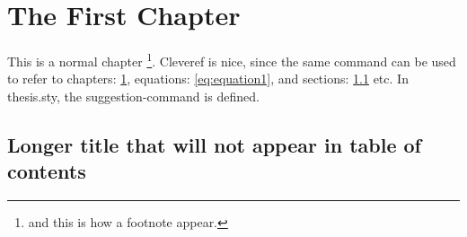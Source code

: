 \chapter{The First Chapter}\label{ch:chapter}

This is a normal chapter \footnote{and this is how a footnote appear.}. Cleveref is nice, since the same command can be used to refer to chapters: \cref{ch:chapter}, equations: \cref{eq:equation1}, and sections: \cref{sec:sec1} etc.  In thesis.sty, the suggestion-command is defined.

\section[Short title]{Longer title that will not appear in table of contents}\label{sec:sec1}

\lipsum[1]